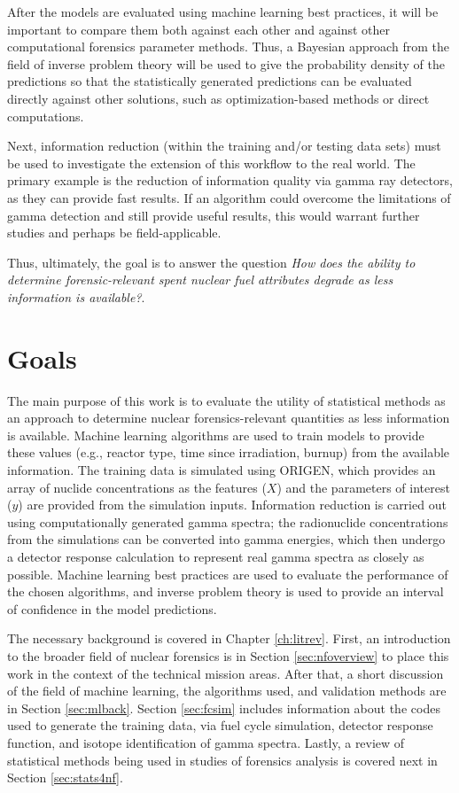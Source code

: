 After the models are evaluated using machine learning best practices, it will
be important to compare them both against each other and against other
computational forensics parameter methods. Thus, a Bayesian approach from the
field of inverse problem theory will be used to give the probability density of
the predictions so that the statistically generated predictions can be
evaluated directly against other solutions, such as optimization-based methods
or direct computations. 

Next, information reduction (within the training and/or testing data sets) must
be used to investigate the extension of this workflow to the real world. The
primary example is the reduction of information quality via gamma ray
detectors, as they can provide fast results.  If an algorithm could overcome
the limitations of gamma detection and still provide useful results, this would
warrant further studies and perhaps be field-applicable.

Thus, ultimately, the goal is to answer the question \textit{How
does the ability to determine forensic-relevant spent nuclear fuel attributes
degrade as less information is available?}. 

\section{Goals}

The main purpose of this work is to evaluate the utility of statistical methods
as an approach to determine nuclear forensics-relevant quantities as less
information is available. Machine learning algorithms are used to train models
to provide these values (e.g., reactor type, time since irradiation, burnup)
from the available information. The training data is simulated using
\gls{ORIGEN}, which provides an array of nuclide concentrations as the features
($X$) and the parameters of interest ($y$) are provided from the simulation
inputs.  Information reduction is carried out using computationally generated
gamma spectra; the radionuclide concentrations from the simulations can be
converted into gamma energies, which then undergo a detector response
calculation to represent real gamma spectra as closely as possible. Machine
learning best practices are used to evaluate the performance of the chosen
algorithms, and inverse problem theory is used to provide an interval of
confidence in the model predictions.

The necessary background is covered in Chapter \ref{ch:litrev}.  First, an
introduction to the broader field of nuclear forensics is in Section
\ref{sec:nfoverview} to place this work in the context of the technical mission
areas. After that, a short discussion of the field of machine learning, the
algorithms used, and validation methods are in Section \ref{sec:mlback}.
Section \ref{sec:fcsim} includes information about the codes used to generate
the training data, via fuel cycle simulation, detector response function, and
isotope identification of gamma spectra.  Lastly, a review of statistical
methods being used in studies of forensics analysis is covered next in Section
\ref{sec:stats4nf}. 

